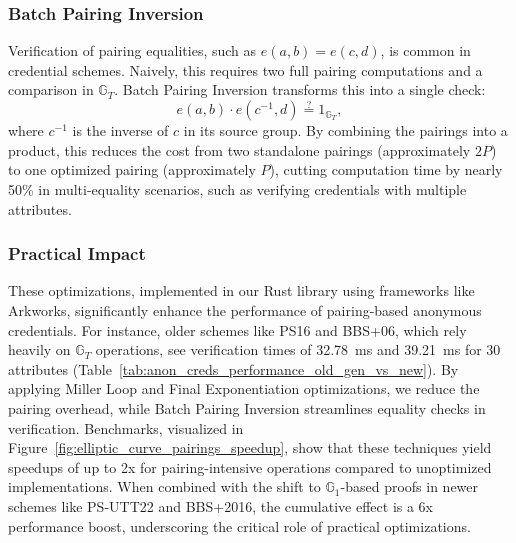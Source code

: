 \subsubsection*{Batch Pairing Inversion}
Verification of pairing equalities, such as $e(a, b) = e(c, d)$, is common in credential schemes. Naively, this requires two full pairing computations and a comparison in $\mathbb{G}_T$. Batch Pairing Inversion transforms this into a single check:
\[
e(a, b) \cdot e(c^{-1}, d) \stackrel{?}{=} 1_{\mathbb{G}_T},
\]
where $c^{-1}$ is the inverse of $c$ in its source group. By combining the pairings into a product, this reduces the cost from two standalone pairings (approximately $2P$) to one optimized pairing (approximately $P$), cutting computation time by nearly 50\% in multi-equality scenarios, such as verifying credentials with multiple attributes.

\subsubsection*{Practical Impact}
These optimizations, implemented in our Rust library using frameworks like Arkworks, significantly enhance the performance of pairing-based anonymous credentials. For instance, older schemes like PS16 and BBS+06, which rely heavily on $\mathbb{G}_T$ operations, see verification times of 32.78~ms and 39.21~ms for 30 attributes (Table~\ref{tab:anon_creds_performance_old_gen_vs_new}). By applying Miller Loop and Final Exponentiation optimizations, we reduce the pairing overhead, while Batch Pairing Inversion streamlines equality checks in verification. Benchmarks, visualized in Figure~\ref{fig:elliptic_curve_pairings_speedup}, show that these techniques yield speedups of up to 2x for pairing-intensive operations compared to unoptimized implementations. When combined with the shift to $\mathbb{G}_1$-based proofs in newer schemes like PS-UTT22 and BBS+2016, the cumulative effect is a 6x performance boost, underscoring the critical role of practical optimizations.

